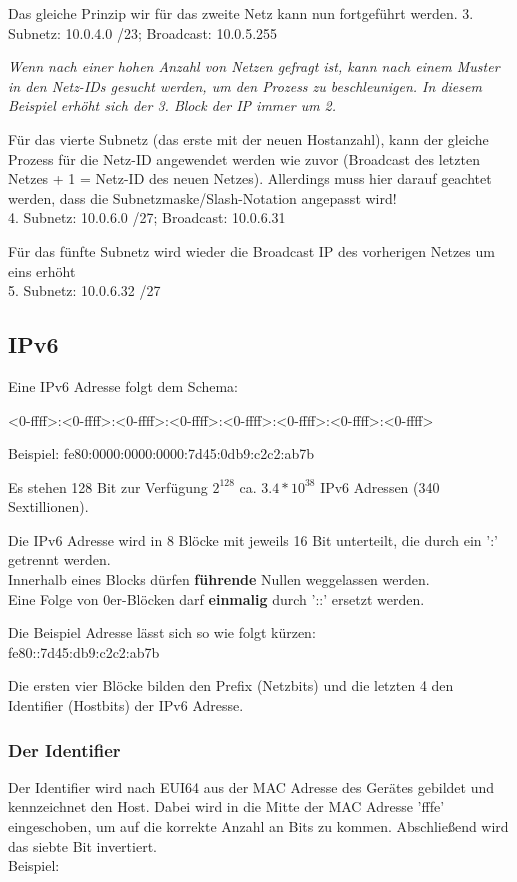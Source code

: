 \documentclass[10pt]{article}
\begin{document}
Das gleiche Prinzip wir für das zweite Netz kann nun fortgeführt werden.
3. Subnetz: 10.0.4.0 /23; Broadcast: 10.0.5.255

\textit{Wenn nach einer hohen Anzahl von Netzen gefragt ist, kann nach einem Muster in den Netz-IDs gesucht werden, um den Prozess zu beschleunigen. In diesem Beispiel erhöht sich der 3. Block der IP immer um 2.}

Für das vierte Subnetz (das erste mit der neuen Hostanzahl), kann der gleiche Prozess für die Netz-ID angewendet werden wie zuvor (Broadcast des letzten Netzes + 1 = Netz-ID des neuen Netzes). Allerdings muss hier darauf geachtet werden, dass die Subnetzmaske/Slash-Notation angepasst wird!\\
4. Subnetz: 10.0.6.0 /27; Broadcast: 10.0.6.31

Für das fünfte Subnetz wird wieder die Broadcast IP des vorherigen Netzes um eins erhöht\\
5. Subnetz: 10.0.6.32 /27


\break
\subsection{IPv6}

Eine IPv6 Adresse folgt dem Schema:

\textless0-ffff\textgreater:\textless0-ffff\textgreater:\textless0-ffff\textgreater:\textless0-ffff\textgreater:\textless0-ffff\textgreater:\textless0-ffff\textgreater:\textless0-ffff\textgreater:\textless0-ffff\textgreater

Beispiel: fe80:0000:0000:0000:7d45:0db9:c2c2:ab7b

Es stehen 128 Bit zur Verfügung \textrightarrow\space \(2^{128}\) \textrightarrow\space ca. \(3.4 * 10^{38}\) IPv6 Adressen (340 Sextillionen).

Die IPv6 Adresse wird in 8 Blöcke mit jeweils 16 Bit unterteilt, die durch ein ':' getrennt werden.\\
Innerhalb eines Blocks dürfen \textbf{führende} Nullen weggelassen werden.\\
Eine Folge von 0er-Blöcken darf \textbf{einmalig} durch '::' ersetzt werden.

Die Beispiel Adresse lässt sich so wie folgt kürzen:\\
fe80::7d45:db9:c2c2:ab7b

Die ersten vier Blöcke bilden den Prefix (Netzbits) und die letzten 4 den Identifier (Hostbits) der IPv6 Adresse.

\subsubsection{Der Identifier}
Der Identifier wird nach EUI64 aus der MAC Adresse des Gerätes gebildet und kennzeichnet den Host. Dabei wird in die Mitte der MAC Adresse 'fffe' eingeschoben, um auf die korrekte Anzahl an Bits zu kommen. Abschließend wird das siebte Bit invertiert.\\
Beispiel:
\end{document}
